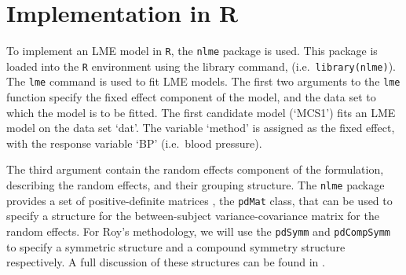 \documentclass[12pt, a4paper]{report}
\theoremstyle{plain}
\theoremstyle{definition}
\theoremstyle{remark}
\begin{document}
\section{Implementation in R}
To implement an LME model in \texttt{R}, the \texttt{nlme} package is used. This package is loaded into the \texttt{R} environment using the library command, (i.e.\ \texttt{library(nlme)}). The \texttt{lme} command is used to fit LME models. The first two arguments to the \texttt{lme} function specify the fixed effect component of the model, and the data set to which the model is to be fitted. The first candidate model (`MCS1') fits an LME model on the data set `dat'. The variable `method' is assigned as the fixed effect, with the response variable `BP' (i.e.\ blood pressure).

The third argument contain the random effects component of the formulation, describing the random effects, and their grouping structure. The \texttt{nlme} package provides a set of positive-definite matrices , the \texttt{pdMat} class, that can be used to specify a structure for the between-subject variance-covariance matrix for the random effects. For Roy's methodology, we will use the \texttt{pdSymm} and \texttt{pdCompSymm} to specify a symmetric structure and a compound symmetry structure respectively. A full discussion of these structures can be found in \citet[pg. 158]{PB}.
\end{document}
